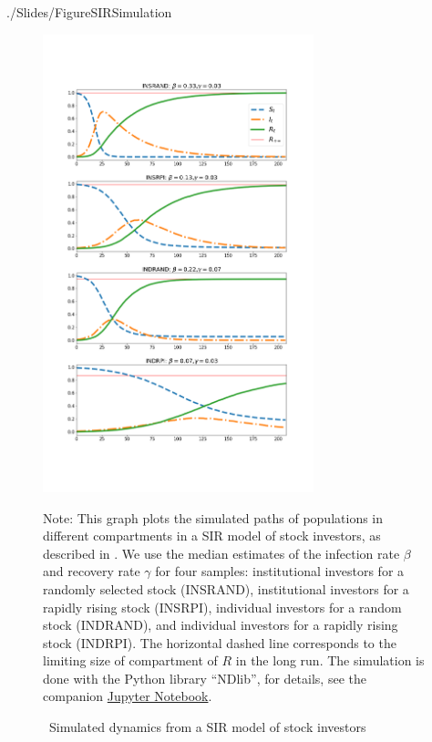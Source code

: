 \newpage

\begin{verbatimwrite}{./Slides/FigureSIRSimulation}%
\begin{figure}[!ht] \centering  %
	\caption{ ~Simulated dynamics from a SIR model of stock investors}
	\label{fig:sir_simulate}
	\centerline{\includegraphics[width=0.7\textwidth]{./figures/sir_simulate.png}}
	\begin{flushleft}
	{\footnotesize Note: This graph plots the simulated paths of populations in different compartments in a SIR model of stock investors, as described in \cite{shiller1989survey}. We use the median estimates of the infection rate $\beta$ and recovery rate $\gamma$ for four samples: institutional investors for a randomly selected stock (INSRAND), institutional investors for a rapidly rising stock (INSRPI), individual investors for a random stock (INDRAND), and individual investors for a rapidly rising stock (INDRPI). The horizontal dashed line corresponds to the limiting size of compartment of $R$ in the long run. The simulation is done with the Python library ``NDlib'', for details, see the companion \href{https://github.com/llorracc/EpiExp/blob/master/SIR_Ndlib.ipynb}{Jupyter Notebook}. }
				\end{flushleft}
\end{figure}
\end{verbatimwrite}%

